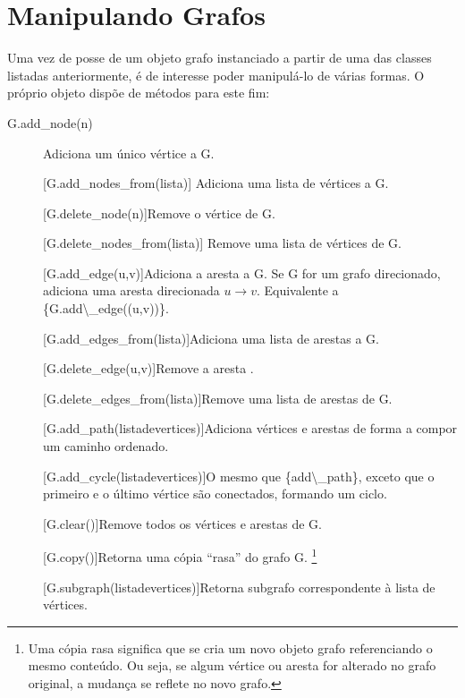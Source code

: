 \documentclass[a4paper,10pt,brazil]{sphinxmanual}
\begin{document}
\section{Manipulando Grafos}
\label{capgraph:manipulando-grafos}
Uma vez de posse de um objeto grafo instanciado a partir de uma das
classes listadas anteriormente, é de interesse poder manipulá-lo de
várias formas. O próprio objeto dispõe de métodos para este fim:
\begin{description}
\item[{G.add\_node(n)}] \leavevmode
Adiciona um único vértice a G.

{[}G.add\_nodes\_from(lista){]} Adiciona uma lista de vértices a G.

{[}G.delete\_node(n){]}Remove o vértice  de G.

{[}G.delete\_nodes\_from(lista){]} Remove uma lista de vértices de G.

{[}G.add\_edge(u,v){]}Adiciona a aresta  a G. Se G for um
grafo direcionado, adiciona uma aresta direcionada
$u\longrightarrow v$. Equivalente a
\{G.add\textbackslash{}\_edge((u,v))\}.

{[}G.add\_edges\_from(lista){]}Adiciona uma lista de arestas a G.

{[}G.delete\_edge(u,v){]}Remove a aresta .

{[}G.delete\_edges\_from(lista){]}Remove uma lista de arestas de G.

{[}G.add\_path(listadevertices){]}Adiciona vértices e arestas de forma
a compor um caminho ordenado.

{[}G.add\_cycle(listadevertices){]}O mesmo que \{add\textbackslash{}\_path\}, exceto
que o primeiro e o último vértice são conectados, formando um
ciclo.

{[}G.clear(){]}Remove todos os vértices e arestas de G.

{[}G.copy(){]}Retorna uma cópia ``rasa'' do grafo G. \footnote{
Uma cópia rasa significa que se cria um novo objeto grafo
referenciando o mesmo conteúdo. Ou seja, se algum vértice ou aresta
for alterado no grafo original, a mudança se reflete no novo
grafo.
}

{[}G.subgraph(listadevertices){]}Retorna subgrafo correspondente à
lista de vértices.

\end{description}
\end{document}
